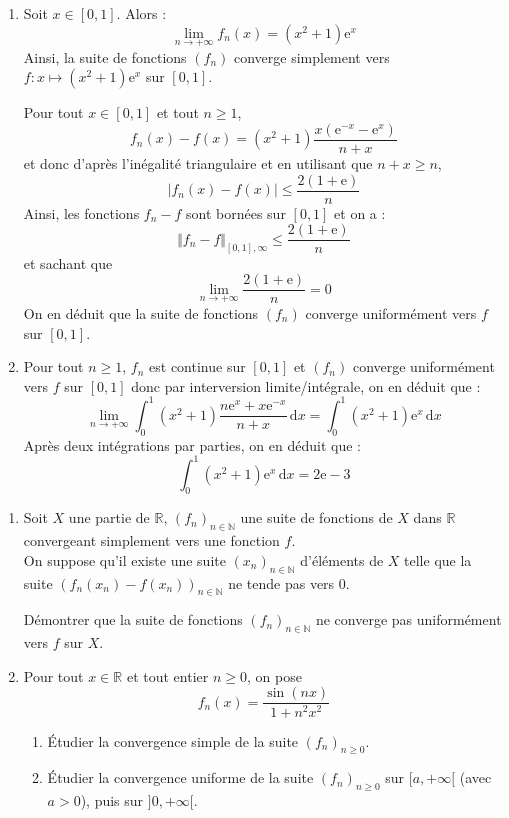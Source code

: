 \documentclass[a4paper,10pt]{report}
\begin{document}
\corr \begin{enumerate}
\item Soit $x \in \left[ {0,1} \right]$. Alors :
$$\lim\limits_{n\to +\infty}^{}f_n (x)=(x^2  + 1){\mathrm{e}}^x $$
Ainsi, la suite de fonctions $(f_n)$ converge simplement vers $f:x \mapsto (x^2  + 1){\mathrm{e}}^x $ sur $\left[ {0,1} \right]$.
\medskip

\noindent Pour tout $x\in \left[ 0,1\right]$ et tout $n \geq 1$, 
$$f_n (x) - f(x) = (x^2  + 1)\dfrac{{x({\mathrm{e}}^{ - x}  - {\mathrm{e}}^x )}}{{n + x}}$$
et donc d'après l'inégalité triangulaire et en utilisant que $n+x \geq n$,
$$\left| {f_n (x) - f(x)} \right| \leqslant \dfrac{{2(1+\textrm{e})}}{n}$$
Ainsi, les fonctions $f_n-f$ sont bornées sur $[0,1]$ et on a :
$$ \Vert f_n -f \Vert_{[0,1], \infty} \leq \dfrac{{2(1+\textrm{e})}}{n}$$
et sachant que 
$$ \lim_{n \rightarrow + \infty} \dfrac{{2(1+\textrm{e})}}{n} = 0 $$
On en déduit que la suite de fonctions $(f_n)$ converge uniformément vers $f$ sur $\left[ {0,1} \right]$.
\item Pour tout $n \geq 1$, $f_n$ est continue sur $[0,1]$ et $(f_n)$ converge uniformément vers $f$ sur $\left[ {0,1} \right]$ donc par interversion limite/intégrale, on en déduit que :
$$\mathop {\lim }\limits_{n \to  + \infty } \displaystyle\int_0^1 {(x^2  + 1)\dfrac{{n{\mathrm{e}}^x  + x{\mathrm{e}}^{ - x} }}{{n + x}}\,{\mathrm{d}}x}  = \displaystyle\int_0^1 {(x^2  + 1){\mathrm{e}}^x \,{\mathrm{d}}x} $$
Après deux intégrations par parties, on en déduit que :
$$\displaystyle\int_0^1 {(x^2  + 1){\mathrm{e}}^x \,{\mathrm{d}}x}  = 2{\mathrm{e}} - 3$$
\end{enumerate}

\begin{Exercice}{} \begin{enumerate}
\item Soit $X$ une partie de $\mathbb{R}$, $\left( f_{n}\right) _{n\in \mathbb{N}}$ une suite de fonctions de $X$ dans $\mathbb{R}$ convergeant simplement vers une fonction $f$. \\
On suppose qu'il existe une suite $\left( x_{n}\right)_{n\in \mathbb{N}}$ d'\'{e}l\'{e}ments de $X$ telle que la suite $\left( f_{n}(x_{n})-f\left( x_{n}\right) \right) _{n\in \mathbb{N}}$ ne tende pas vers $0$. \bigskip

D\'{e}montrer que la suite de fonctions $\left( f_{n}\right) _{n\in \mathbb{N}}$ ne converge pas uniform\'{e}ment vers $f$ sur $X$.

\item Pour tout $x\in\mathbb{R}$ et tout entier $n \geq 0$, on pose 
$$f_{n}(x) =\dfrac{\sin \left( nx\right) }{1+n^{2}x^{2}}$$
	\begin{enumerate}
	\item \'Etudier la convergence simple de la suite $\left( f_{n}\right)_{n \geq 0}$.
	\item \'Etudier la convergence uniforme de la suite $\left( f_{n}\right)_{n \geq 0}$ sur $[a,+\infty[$ (avec $a>0$),  puis sur $]0,+\infty[$.
	\end{enumerate}
\end{enumerate}
\end{Exercice}
\end{document}
